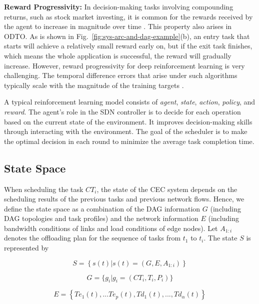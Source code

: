 \documentclass[10pt, conference, letterpaper]{IEEEtran}
\begin{document}
\textbf{Reward Progressivity:} In decision-making tasks involving compounding returns, such as stock market investing, it is common for the rewards received by the agent to increase in magnitude over time \cite{dann2021adapting}. This property also arises in ODTO. As is shown in Fig.~\ref{fig:sys-arc-and-dag-example}(b), an entry task that starts will achieve a relatively small reward early on, but if the exit task finishes, which means the whole application is successful, the reward will gradually increase. However, reward progressivity for deep reinforcement learning is very challenging. The temporal difference errors that arise under such algorithms typically scale with the magnitude of the training targets \cite{dann2021adapting}. 

A typical reinforcement learning model consists of \textit{agent}, \textit{state}, \textit{action}, \textit{policy}, and \textit{reward}. The agent's role in the SDN controller is to decide for each operation based on the current state of the environment. It improves decision-making skills through interacting with the environment. The goal of the scheduler is to make the optimal decision in each round to minimize the average task completion time.

\subsection{State Space} When scheduling the task $CT_i$, the state of the CEC system depends on the scheduling results of the previous tasks and previous network flows. Hence, we define the state space as a combination of the DAG information $G$ (including DAG topologies and task profiles) and the network information $E$ (including bandwidth conditions of links and load conditions of edge nodes). Let $A_{1:i}$ denotes the offloading
plan for the sequence of tasks from $t_1$ to $t_i$. The state $S$ is represented by

\begin{equation}
    S = \left\{s(t) | s(t) = (G, E, A_{1:i}) \right\}
\end{equation}

\begin{equation}
    G = \{ g_i | g_i = ( CT_i, T_i, P_i )\}
\end{equation}

\begin{equation}
    E = \left\{Te_1 (t), ... Te_p (t), Td_1 (t), ..., Td_\alpha (t)\right\}
\end{equation}
\end{document}
